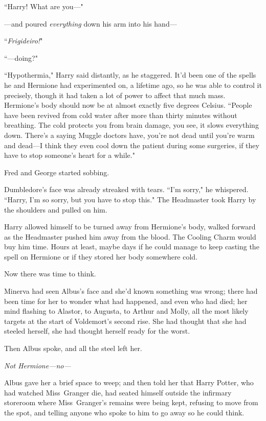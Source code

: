 ``Harry! What are you—"

—and poured \emph{everything} down his arm into his hand—

``\emph{Frigideiro!}"

``—doing?"

``Hypothermia," Harry said distantly, as he staggered. It'd been one of the spells he and Hermione had experimented on, a lifetime ago, so he was able to control it precisely, though it had taken a lot of power to affect that much mass. Hermione's body should now be at almost exactly five degrees Celsius. ``People have been revived from cold water after more than thirty minutes without breathing. The cold protects you from brain damage, you see, it slows everything down. There's a saying Muggle doctors have, you're not dead until you're warm and dead—I think they even cool down the patient during some surgeries, if they have to stop someone's heart for a while."

Fred and George started sobbing.

Dumbledore's face was already streaked with tears. ``I'm sorry," he whispered. ``Harry, I'm so sorry, but you have to stop this." The Headmaster took Harry by the shoulders and pulled on him.

Harry allowed himself to be turned away from Hermione's body, walked forward as the Headmaster pushed him away from the blood. The Cooling Charm would buy him time. Hours at least, maybe days if he could manage to keep casting the spell on Hermione or if they stored her body somewhere cold.

Now there was time to think.

\later

Minerva had seen Albus's face and she'd known something was wrong; there had been time for her to wonder what had happened, and even who had died; her mind flashing to Alastor, to Augusta, to Arthur and Molly, all the most likely targets at the start of Voldemort's second rise. She had thought that she had steeled herself, she had thought herself ready for the worst.

Then Albus spoke, and all the steel left her.

\emph{Not Hermione—no—}

Albus gave her a brief space to weep; and then told her that Harry Potter, who had watched Miss~Granger die, had seated himself outside the infirmary storeroom where Miss~Granger's remains were being kept, refusing to move from the spot, and telling anyone who spoke to him to go away so he could think.

